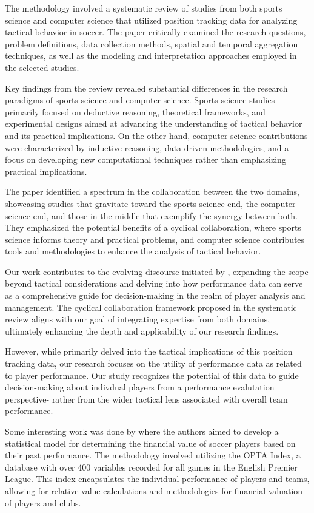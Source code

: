 \documentclass[12pt]{article}
\begin{document}
The methodology involved a systematic review of studies from both sports science
and computer science that utilized position tracking data for analyzing tactical
behavior in soccer. The paper critically examined the research questions,
problem definitions, data collection methods, spatial and temporal aggregation
techniques, as well as the modeling and interpretation approaches employed in the
selected studies.

Key findings from the review revealed substantial differences in the research
paradigms of sports science and computer science. Sports science studies primarily
focused on deductive reasoning, theoretical frameworks, and experimental designs
aimed at advancing the understanding of tactical behavior and its practical
implications. On the other hand, computer science contributions were characterized
by inductive reasoning, data-driven methodologies, and a focus on developing new
computational techniques rather than emphasizing practical implications.

The paper identified a spectrum in the collaboration between the two domains,
showcasing studies that gravitate toward the sports science end, the computer
science end, and those in the middle that exemplify the synergy between both.
They emphasized the potential benefits of a cyclical collaboration, where sports
science informs theory and practical problems, and computer science contributes
tools and methodologies to enhance the analysis of tactical behavior.

Our work contributes to the evolving discourse initiated by \citet{goes2021unlocking},
expanding the scope beyond tactical considerations and delving into how performance
data can serve as a comprehensive guide for decision-making in the realm of
player analysis and management. The cyclical collaboration framework proposed in
the systematic review aligns with our goal of integrating expertise from both
domains, ultimately enhancing the depth and applicability of our research findings.

However, while \citet{goes2021unlocking} primarily delved into the tactical
implications of this position tracking data, our research focuses on the  
utility of performance data as related to player performance. 
Our study recognizes the potential of this data to guide decision-making about
indivdual players from a performance evalutation perspective- rather from the 
wider tactical lens associated with overall team performance.


Some interesting work was done by \citet{tunaru2010valuations} where
the authors aimed to develop a statistical model for
determining the financial value of soccer players based on their past performance.
The methodology involved utilizing the OPTA Index, a database with over 400
variables recorded for all games in the English Premier League. This index
encapsulates the individual performance of players and teams, allowing for
relative value calculations and methodologies for financial valuation of players
and clubs.
\end{document}
